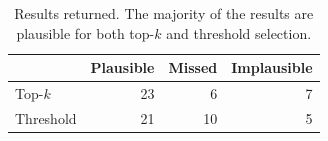 \begin{table}[t]
  \setlength{\tabcolsep}{.25em}
  \footnotesize
  \centering

  \begin{tabular}{ l r r r }
    \toprule
              & Plausible & Missed & Implausible \\
    \midrule
    Top-$k$   & 23        & 6      & 7           \\
    Threshold & 21        & 10     & 5           \\

    \bottomrule
  \end{tabular}

  \caption{Results returned. The majority of the results are plausible for both top-$k$ and threshold selection.}
  \label{tbl:covid_stats}
\end{table}
